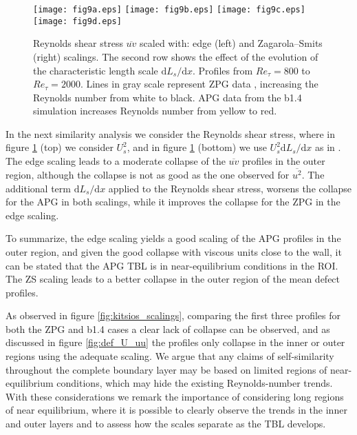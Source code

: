 \begin{figure}
\texttt{[image: fig9a.eps]}
\texttt{[image: fig9b.eps]}
\texttt{[image: fig9c.eps]}
\texttt{[image: fig9d.eps]}
\caption{Reynolds shear stress $\overline{uv}$ scaled with: edge (left) and Zagarola--Smits (right) scalings. The second row shows the effect of the evolution of the characteristic length scale $\textrm{d} L_s/\textrm{d}x$. Profiles from $Re_{\tau}=800$ to $Re_{\tau}=2000$. Lines in gray scale represent ZPG data \citep{E-AmorZPG}, increasing the Reynolds number from white to black. APG data from the b1.4 simulation increases Reynolds number from yellow to red.}
\label{fig:uv_scalings}
\end{figure}

In the next similarity analysis we consider the Reynolds shear stress, where in figure \ref{fig:uv_scalings} (top) we consider $U_s^2$, and in figure \ref{fig:uv_scalings} (bottom) we use $U_s^2 \textrm{d} L_s/\textrm{d}x$ as in \cite{Kitsios2016, Gibis2019}.
The edge scaling leads to a moderate collapse of the $\overline{uv}$ profiles in the outer region, although the collapse is not as good as the one observed for $\overline{u^2}$.
The additional term $\textrm{d} L_s/\textrm{d}x$ applied to the Reynolds shear stress, worsens the collapse for the APG in both scalings, while it improves the collapse for the ZPG in the edge scaling.

To summarize, the edge scaling yields a good scaling of the APG profiles in the outer region, and given the good collapse with viscous units close to the wall, it can be stated that the APG TBL is in near-equilibrium  \citep{Marusic_PoF_2010, bobke2017} conditions in the ROI.
The ZS scaling leads to a better collapse in the outer region of the mean defect profiles.

As observed in figure \ref{fig:kitsios_scalings},
comparing the first three profiles for both the ZPG and b1.4 cases a clear lack of collapse 
can be observed, and as discussed in figure \ref{fig:def_U_uu} the profiles only collapse in the inner or outer regions using the adequate scaling. We argue that any claims of self-similarity throughout the complete boundary layer may be based on limited regions of near-equilibrium conditions, which may hide the existing Reynolds-number trends. 
With these considerations we remark the importance of considering long regions of near equilibrium, where it is possible to clearly observe the trends in the inner and outer layers and to assess how the scales separate as the TBL develops. 

